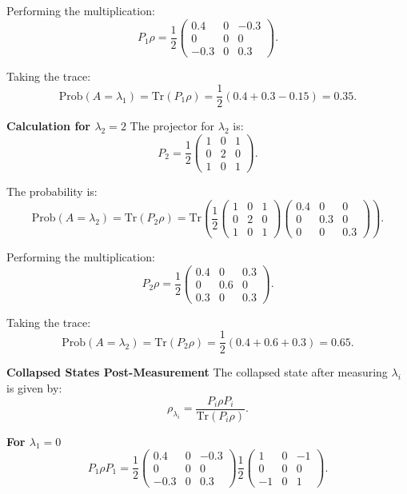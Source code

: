 \documentclass{article}
\theoremstyle{plain}
\numberwithin{thm}{section}
\theoremstyle{definition}
\begin{document}
\begin{enumerate}
    Performing the multiplication:
    \[
    P_1 \rho = 
    \frac{1}{2}
    \begin{pmatrix}
    0.4 & 0 & -0.3 \\
    0 & 0 & 0 \\
    -0.3 & 0 & 0.3
    \end{pmatrix}.
    \]
    
    Taking the trace:
    \[
    \text{Prob}(A = \lambda_1) = \text{Tr}(P_1 \rho) = \frac{1}{2}(0.4 + 0.3 - 0.15) = 0.35.
    \]
    
    \textbf{Calculation for $\lambda_2 = 2$}  
    The projector for $\lambda_2$ is:
    \[
    P_2 = \frac{1}{2}
    \begin{pmatrix}
    1 & 0 & 1 \\
    0 & 2 & 0 \\
    1 & 0 & 1
    \end{pmatrix}.
    \]
    
    The probability is:
    \[
    \text{Prob}(A = \lambda_2) = \text{Tr}(P_2 \rho) = 
    \text{Tr}\left(
    \frac{1}{2}
    \begin{pmatrix}
    1 & 0 & 1 \\
    0 & 2 & 0 \\
    1 & 0 & 1
    \end{pmatrix}
    \begin{pmatrix}
    0.4 & 0 & 0 \\
    0 & 0.3 & 0 \\
    0 & 0 & 0.3
    \end{pmatrix}
    \right).
    \]
    
    Performing the multiplication:
    \[
    P_2 \rho = 
    \frac{1}{2}
    \begin{pmatrix}
    0.4 & 0 & 0.3 \\
    0 & 0.6 & 0 \\
    0.3 & 0 & 0.3
    \end{pmatrix}.
    \]
    
    Taking the trace:
    \[
    \text{Prob}(A = \lambda_2) = \text{Tr}(P_2 \rho) = \frac{1}{2}(0.4 + 0.6 + 0.3) = 0.65.
    \]
    
    \textbf{Collapsed States Post-Measurement}  
    The collapsed state after measuring $\lambda_i$ is given by:
    \[
    \rho_{\lambda_i} = \frac{P_i \rho P_i}{\text{Tr}(P_i \rho)}.
    \]
    
    \textbf{For $\lambda_1 = 0$}  
    \[
    P_1 \rho P_1 = \frac{1}{2}
    \begin{pmatrix}
    0.4 & 0 & -0.3 \\
    0 & 0 & 0 \\
    -0.3 & 0 & 0.3
    \end{pmatrix}
    \frac{1}{2}
    \begin{pmatrix}
    1 & 0 & -1 \\
    0 & 0 & 0 \\
    -1 & 0 & 1
    \end{pmatrix}.
    \]
    

\end{enumerate}
\end{document}
